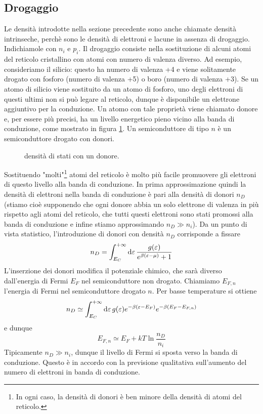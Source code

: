 \documentclass[a4paper, 11pt]{article}
\begin{document}
	\subsection{Drogaggio}
	Le densità introdotte nella sezione precedente sono anche chiamate densità intrinseche, perchè sono le densità di elettroni e lacune in assenza di drogaggio. Indichiamole con $n_i$ e $p_i$. Il drogaggio consiste nella sostituzione di alcuni atomi del reticolo cristallino con atomi con numero di valenza diverso. Ad esempio, consideriamo il silicio: questo ha numero di valenza +4 e viene solitamente drogato con fosforo (numero di valenza +5) o boro (numero di valenza +3). Se un atomo di silicio viene sostituito da un atomo di fosforo, uno degli elettroni di questi ultimi non si può legare al reticolo, dunque è disponibile un elettrone aggiuntivo per la conduzione. Un atomo con tale proprietà viene chiamato donore e, per essere più precisi, ha un livello energetico pieno vicino alla banda di conduzione, come mostrato in figura \ref{fig:donori}. Un semiconduttore di tipo $n$ è un semiconduttore drogato con donori.
	\begin{figure}[h!]
		\centering
		\caption{densità di stati con un donore.}
		\label{fig:donori}
	\end{figure} Sostituendo "molti"\footnote{In ogni caso, la densità di donori è ben minore della densità di atomi del reticolo.} atomi del reticolo è molto più facile promuovere gli elettroni di questo livello alla banda di conduzione. In prima approssimazione quindi la densità di elettroni nella banda di conduzione è pari alla densità di donori $n_D$ (stiamo cioè supponendo che ogni donore abbia un solo elettrone di valenza in più rispetto agli atomi del reticolo, che tutti questi elettroni sono stati promossi alla banda di conduzione e infine stiamo approssimando $n_D\gg n_i$). Da un punto di vista statistico, l'introduzione di donori con densità $n_D$ corrisponde a fissare
	\[n_D=\int_{E_C}^{+\infty}\mathrm{d} \varepsilon\,\frac{g(\varepsilon)}{e^{\beta(\varepsilon-\mu)}+1}\]
	L'inserzione dei donori modifica il potenziale chimico, che sarà diverso dall'energia di Fermi $E_F$ nel semiconduttore non drogato. Chiamiamo $E_{F,n}$ l'energia di Fermi nel semiconduttore drogato $n$. Per basse temperature si ottiene
	\[n_D\simeq\int_{E_C}^{+\infty}\mathrm{d} \varepsilon\,g(\varepsilon)e^{-\beta(\varepsilon-E_F)}e^{-\beta(E_F-E_{F,n})}\]
	e dunque
	\[E_{F,n}\simeq E_F+kT\ln\frac{n_D}{n_i}\]
	Tipicamente $n_D\gg n_i$, dunque il livello di Fermi si sposta verso la banda di conduzione. Questo è in accordo con la previsione qualitativa sull'aumento del numero di elettroni in banda di conduzione.
	
\end{document}
